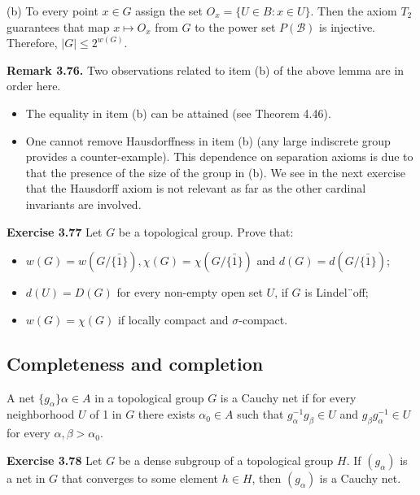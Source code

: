 \documentclass[12pt]{article}
\begin{document}
    (b) To every point $x \in G$ assign the set $O_x = \{U \in B : x \in U\}$. Then the axiom $T_2$ guarantees that map
$x \mapsto O_x$ from $G$ to the power set $P(\mathcal{B})$ is injective. Therefore, $|G| \leq 2^{w(G)}$.


\textbf{Remark 3.76.} Two observations related to item (b) of the above lemma are in order here.


\begin{itemize}

    \item The equality in item (b) can be attained (see Theorem 4.46).
    
    \item One cannot remove Hausdorffness in item (b) (any large indiscrete group provides a counter-example).
    This dependence on separation axioms is due to that the presence of the size of the group in (b). We see
    in the next exercise that the Hausdorff axiom is not relevant as far as the other cardinal invariants are
    involved.

\end{itemize}


\textbf{Exercise 3.77} Let $G$ be a topological group. Prove that:

\begin{itemize}

    \item $w(G) = w(G/ \bar{\{1\}}), \chi(G) = \chi(G/ \bar{\{1\}})$ and $d(G) = d(G / \bar{\{1\}})$;
    
    \item $d(U) = D(G)$ for every non-empty open set $U$, if $G$ is Lindel¨off;

    \item $w(G) = \chi(G)$ if locally compact and $\sigma$-compact.

\end{itemize}


\subsection{Completeness and completion}


    A net $\{ g_\alpha \} \alpha \in A$ in a topological group $G$ is a Cauchy net if for every neighborhood $U$ of 1 in $G$ there exists
$\alpha_0 \in A$ such that $g^{-1}_\alpha g_\beta \in U$ and $g_\beta g^{-1}_\alpha \in U$ for every $\alpha, \beta > \alpha_0$.


\textbf{Exercise 3.78} Let $G$ be a dense subgroup of a topological group $H$. If $(g_\alpha)$ is a net in $G$ that converges to
some element $h \in H$, then $(g_\alpha)$ is a Cauchy net.
\end{document}
